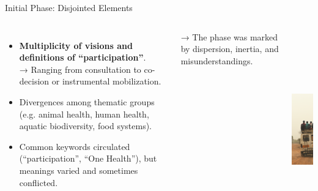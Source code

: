 \documentclass[newPxFont]{beamer}
\begin{document}
\begin{frame}[c]{Initial Phase: Disjointed Elements}
  \vspace{-0.5cm}
  \begin{columns}[onlytextwidth,T]
    \column{\dimexpr\linewidth-30mm-5mm}

    \begin{itemize}
      \item \textbf{Multiplicity of visions and definitions of “participation”}.\\  
            → Ranging from consultation to co-decision or instrumental mobilization.  
      \item Divergences among thematic groups  
            (e.g. animal health, human health, aquatic biodiversity, food systems).  
      \item Common keywords circulated (“participation”, “One Health”), 
            but meanings varied and sometimes conflicted.  
    \end{itemize}

    → The phase was marked by dispersion, inertia, and misunderstandings.

    \column{30mm}
    \includegraphics[height=8.5cm]{img/bus_mbane}
  \end{columns}
\end{frame}
\end{document}

